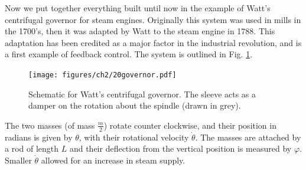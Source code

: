 \begin{ex}
	Now we put together everything built until now in the example of Watt's centrifugal governor for steam engines. Originally this system was used in mills in the 1700's, then it was adapted by Watt to the steam engine in 1788. This adaptation has been credited as a major factor in the industrial revolution, and is a first example of feedback control. The system is outlined in Fig. \ref{fig:governor}.
\begin{figure}[h!]
	\centering
	\texttt{[image: figures/ch2/20governor.pdf]}
	\caption{Schematic for Watt's centrifugal governor. The sleeve acts as a damper on the rotation about the spindle (drawn in grey).}
	\label{fig:governor}
\end{figure}
The two masses (of mass $\frac{m}{2}$) rotate counter clockwise, and their position in radians is given by $\theta$, with their rotational velocity $\dot{\theta}$. The masses are attached by a rod of length $L$ and their deflection from the vertical position is measured by $\varphi$. Smaller $\dot{\theta}$ allowed for an increase in steam supply.


\end{ex}
